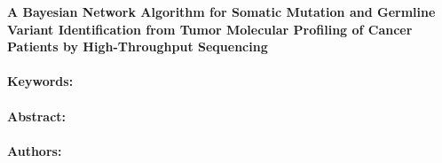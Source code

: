 \noindent
\large {\bf A Bayesian Network Algorithm for Somatic Mutation and Germline Variant Identification from Tumor Molecular Profiling of Cancer Patients by High-Throughput Sequencing} 


\normalsize 


\noindent \paragraph{Keywords:} 

\noindent \paragraph{Abstract:} 



\noindent \paragraph{Authors:} 

